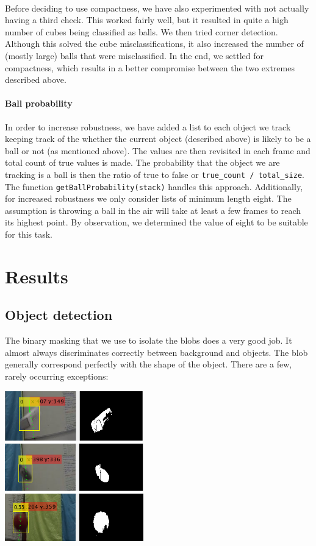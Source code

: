 \documentclass[10pt,a4paper]{article}
\begin{document}
\paragraph{} Before deciding to use compactness, we have also experimented with not actually having a third check. This worked fairly well, but it resulted in quite a high number of cubes being classified as balls. We then tried corner detection. Although this solved the cube misclassifications, it also increased the number of (mostly large) balls that were misclassified. In the end, we settled for compactness, which results in a better compromise between the two extremes described above.

\paragraph{Ball probability} In order to increase robustness, we have added a list to each object we track keeping track of the whether the current object (described above) is likely to be a ball or not (as mentioned above). The values are then revisited in each frame and total count of true values is made. The probability that the object we are tracking is a ball is then the ratio of true to false or \texttt{true\_count / total\_size}. The function \texttt{getBallProbability(stack)} handles this approach. Additionally, for increased robustness we only consider lists of minimum length eight. The assumption is throwing a ball in the air will take at least a few frames to reach its highest point. By observation, we determined the value of eight to be suitable for this task.


\section{Results}

\subsection{Object detection}
The binary masking that we use to isolate the blobs does a very good job. It almost always discriminates correctly between background and objects. The blob generally correspond perfectly with the shape of the object. There are a few, rarely occurring exceptions:

\begin{center}
  \includegraphics[width=6cm]{fault_background.png}
\end{center}
\end{document}
